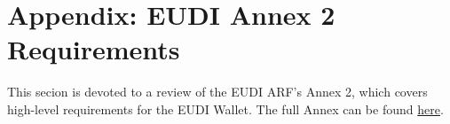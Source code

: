 \documentclass{iacrtrans}
\begin{document}



\section{Appendix: EUDI Annex 2 Requirements}

This secion is devoted to a review of the EUDI ARF's Annex 2, which covers high-level requirements for the EUDI Wallet. 
The full Annex can be found \href{https://eu-digital-identity-wallet.github.io/eudi-doc-architecture-and-reference-framework/1.4.0/annexes/annex-2/annex-2-high-level-requirements/#a231-topic-1-accessing-public-and-private-online-services-with-eudi-wallet}{here}.
\end{document}
